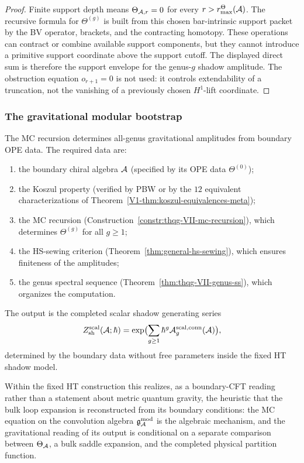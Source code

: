 \begin{proof}
Finite support depth means
\(\Theta_{\mathcal{A},r}=0\) for every \(r>r^\Theta_{\max}(\mathcal{A})\). The
recursive formula for \(\Theta^{(g)}\) is built from this chosen
bar-intrinsic support packet by the BV operator, brackets, and the
contracting homotopy. These operations can contract or combine
available support components, but they cannot introduce a primitive
support coordinate above the support cutoff. The displayed direct sum
is therefore the support envelope for the genus-\(g\) shadow amplitude.
The obstruction equation \(o_{r+1}=0\) is not used: it controls
extendability of a truncation, not the vanishing of a previously
chosen \(H^1\)-lift coordinate.
\end{proof}

\subsubsection{The gravitational modular bootstrap}

\begin{remark}
The MC recursion determines all-genus gravitational amplitudes
from boundary OPE data. The required data are:
\begin{enumerate}[label=(\arabic*)]
\item the boundary chiral algebra $\mathcal{A}$ (specified by its
 OPE data $\Theta^{(0)}$);
\item the Koszul property (verified by PBW or by the $12$
 equivalent characterizations of
 Theorem~\ref*{V1-thm:koszul-equivalences-meta});
\item the MC recursion
 (Construction~\ref{constr:thqg-VII-mc-recursion}), which
 determines $\Theta^{(g)}$ for all $g \geq 1$;
\item the HS-sewing criterion
 (Theorem~\ref{thm:general-hs-sewing}), which ensures
 finiteness of the amplitudes;
\item the genus spectral sequence
 (Theorem~\ref{thm:thqg-VII-genus-ss}), which organizes
 the computation.
\end{enumerate}
The output is the completed scalar shadow generating series
\[
Z_{\mathrm{sh}}^{\mathrm{scal}}(\mathcal{A};\hbar)
=\exp\bigl(\sum_{g \geq 1}\hbar^g
\mathcal{A}_g^{\mathrm{scal,conn}}(\mathcal{A})\bigr),
\]
determined by the boundary data without free parameters inside the
fixed HT shadow model.

Within the fixed HT construction this realizes, as a boundary-CFT
reading rather than a statement about metric quantum gravity, the
heuristic that the bulk loop expansion is reconstructed from its
boundary conditions: the MC equation on the convolution algebra
$\mathfrak{g}_{\mathcal{A}}^{\mathrm{mod}}$ is the algebraic mechanism, and the gravitational reading of
its output is conditional on a separate comparison between
\(\Theta_{\mathcal{A}}\), a bulk saddle expansion, and the completed physical
partition function.
\end{remark}

